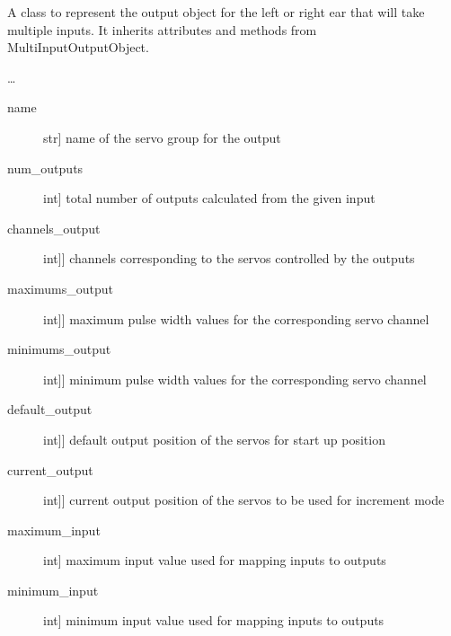 \documentclass[letterpaper,10pt,english]{sphinxmanual}
\begin{document}
\begin{fulllineitems}
\label{\detokenize{specific:EarOutput.EarOutput}}
\sphinxAtStartPar
A class to represent the output object for the left or right ear that will take multiple inputs.
It inherits attributes and methods from MultiInputOutputObject.

\sphinxAtStartPar
…

\sphinxAtStartPar
{}
\begin{description}
\item[{name}] \leavevmode{[}str{]}
\sphinxAtStartPar
name of the servo group for the output

\item[{num\_outputs}] \leavevmode{[}int{]}
\sphinxAtStartPar
total number of outputs calculated from the given input

\item[{channels\_output}] \leavevmode{[}{[}int{]}{]}
\sphinxAtStartPar
channels corresponding to the servos controlled by the outputs

\item[{maximums\_output}] \leavevmode{[}{[}int{]}{]}
\sphinxAtStartPar
maximum pulse width values for the corresponding servo channel

\item[{minimums\_output}] \leavevmode{[}{[}int{]}{]}
\sphinxAtStartPar
minimum pulse width values for the corresponding servo channel

\item[{default\_output}] \leavevmode{[}{[}int{]}{]}
\sphinxAtStartPar
default output position of the servos for start up position

\item[{current\_output}] \leavevmode{[}{[}int{]}{]}
\sphinxAtStartPar
current output position of the servos to be used for increment mode

\item[{maximum\_input}] \leavevmode{[}int{]}
\sphinxAtStartPar
maximum input value used for mapping inputs to outputs

\item[{minimum\_input}] \leavevmode{[}int{]}
\sphinxAtStartPar
minimum input value used for mapping inputs to outputs


\end{description}
\end{fulllineitems}
\end{document}
